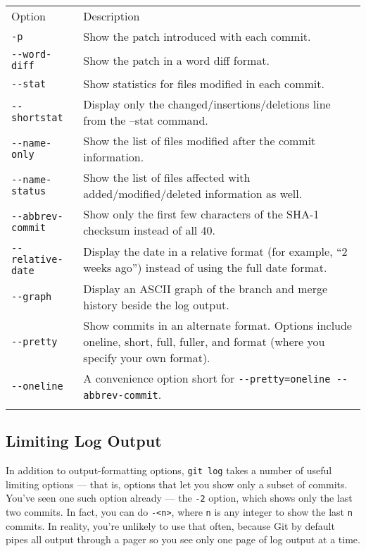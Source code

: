 \documentclass[a4paper]{book}
\newcounter{tab}[chapter]
\begin{document}
\begin{longtable}[c]{@{}lp{10cm}@{}}
\caption{~}\\
\toprule\addlinespace
Option & Description
\\\addlinespace
\midrule\endhead
\texttt{-p} & Show the patch introduced with each commit.
\\\addlinespace
\texttt{-{}-word-diff} & Show the patch in a word diff format.
\\\addlinespace
\texttt{-{}-stat} & Show statistics for files modified in each commit.
\\\addlinespace
\texttt{-{}-shortstat} & Display only the changed/insertions/deletions line from the --stat command.
\\\addlinespace
\texttt{-{}-name-only} & Show the list of files modified after the commit information.
\\\addlinespace
\texttt{-{}-name-status} & Show the list of files affected with added/modified/deleted information as well.
\\\addlinespace
\texttt{-{}-abbrev-commit} & Show only the first few characters of the SHA-1 checksum instead of all 40.
\\\addlinespace
\texttt{-{}-relative-date} & Display the date in a relative format (for example, “2 weeks ago”) instead of using the full date format.
\\\addlinespace
\texttt{-{}-graph} & Display an ASCII graph of the branch and merge history beside the log output.
\\\addlinespace
\texttt{-{}-pretty} & Show commits in an alternate format. Options include oneline, short, full, fuller, and format (where you specify your own format).
\\\addlinespace
\texttt{-{}-oneline} & A convenience option short for \texttt{-{}-pretty=oneline -{}-abbrev-commit}.
\\\addlinespace
\bottomrule
\end{longtable}

\subsection{Limiting Log Output}\label{limiting-log-output}

In addition to output-formatting options, \texttt{git log} takes a number of useful limiting options --- that is, options that let you show only a subset of commits. You've seen one such option already --- the \texttt{-2} option, which shows only the last two commits. In fact, you can do \texttt{-\textless{}n\textgreater{}}, where \texttt{n} is any integer to show the last \texttt{n} commits. In reality, you're unlikely to use that often, because Git by default pipes all output through a pager so you see only one page of log output at a time.
\end{document}
